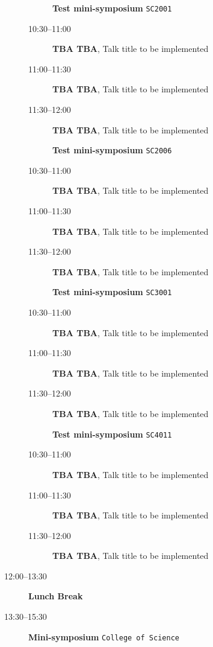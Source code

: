 \documentclass[ILAS2025-program.tex]{subfiles}
\begin{document}
\begin{description}
\begin{description}
        \end{description}
    \begin{description}
    \item[] \textbf{Test mini-symposium} {\footnotesize\texttt{SC2001}}
    \item[10:30--11:00] \textbf{TBA TBA}, Talk title to be implemented
        \item[11:00--11:30] \textbf{TBA TBA}, Talk title to be implemented
        \item[11:30--12:00] \textbf{TBA TBA}, Talk title to be implemented
        \end{description}
    \begin{description}
    \item[] \textbf{Test mini-symposium} {\footnotesize\texttt{SC2006}}
    \item[10:30--11:00] \textbf{TBA TBA}, Talk title to be implemented
        \item[11:00--11:30] \textbf{TBA TBA}, Talk title to be implemented
        \item[11:30--12:00] \textbf{TBA TBA}, Talk title to be implemented
        \end{description}
    \begin{description}
    \item[] \textbf{Test mini-symposium} {\footnotesize\texttt{SC3001}}
    \item[10:30--11:00] \textbf{TBA TBA}, Talk title to be implemented
        \item[11:00--11:30] \textbf{TBA TBA}, Talk title to be implemented
        \item[11:30--12:00] \textbf{TBA TBA}, Talk title to be implemented
        \end{description}
    \begin{description}
    \item[] \textbf{Test mini-symposium} {\footnotesize\texttt{SC4011}}
    \item[10:30--11:00] \textbf{TBA TBA}, Talk title to be implemented
        \item[11:00--11:30] \textbf{TBA TBA}, Talk title to be implemented
        \item[11:30--12:00] \textbf{TBA TBA}, Talk title to be implemented
        \end{description}
    \item[12:00--13:30] \textbf{Lunch Break} {\footnotesize\texttt{}}
    \item[13:30--15:30] \textbf{Mini-symposium} {\footnotesize\texttt{College of Science}}

\end{description}
\end{document}
